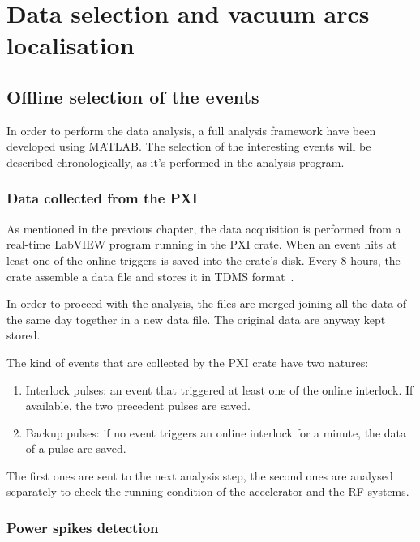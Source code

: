 \chapter[Data selection and vacuum arcs localisation]{Data selection and vacuum arcs localisation}

\section[Offline selection of the events]{Offline selection of the events}

In order to perform the data analysis, a full analysis framework have been developed using MATLAB. The selection of the interesting events will be described chronologically, as it's performed in the analysis program.

\subsection[Data collected from the PXI]{Data collected from the PXI}

As mentioned in the previous chapter, the data acquisition is performed from a real-time LabVIEW program running in the PXI crate. When an event hits at least one of the online triggers is saved into the crate's disk. Every 8 hours, the crate assemble a data file and stores it in TDMS format~\cite{NI:TDMS}. 

In order to proceed with the analysis, the files are merged joining all the data of the same day together in a new data file. The original data are anyway kept stored.

The kind of events that are collected by the PXI crate have two natures:
\begin{enumerate}
\item Interlock pulses: an event that triggered at least one of the online interlock. If available, the two precedent pulses are saved.
\item Backup pulses: if no event triggers an online interlock for a minute, the data of a pulse are saved.
\end{enumerate}
The first ones are sent to the next analysis step, the second ones are analysed separately to check the running condition of the accelerator and the RF systems.


\newpage
\subsection[Power spikes detection]{Power spikes detection}

